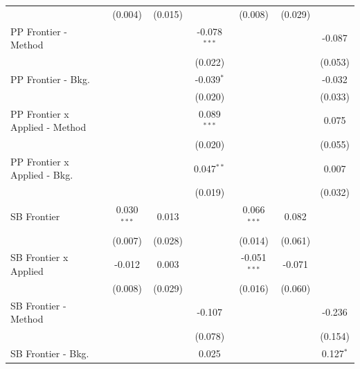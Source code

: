 \begin{tabular}{lcccccc}
                                  & (0.004)        & (0.015)        &                & (0.008)        & (0.029)        &   \\   
   PP Frontier - Method           &                &                & -0.078$^{***}$ &                &                & -0.087\\   
                                  &                &                & (0.022)        &                &                & (0.053)\\   
   PP Frontier - Bkg.             &                &                & -0.039$^{*}$   &                &                & -0.032\\   
                                  &                &                & (0.020)        &                &                & (0.033)\\   
   PP Frontier x Applied - Method &                &                & 0.089$^{***}$  &                &                & 0.075\\   
                                  &                &                & (0.020)        &                &                & (0.055)\\   
   PP Frontier x Applied - Bkg.   &                &                & 0.047$^{**}$   &                &                & 0.007\\   
                                  &                &                & (0.019)        &                &                & (0.032)\\   
   SB Frontier                    & 0.030$^{***}$  & 0.013          &                & 0.066$^{***}$  & 0.082          &   \\   
                                  & (0.007)        & (0.028)        &                & (0.014)        & (0.061)        &   \\   
   SB Frontier x Applied          & -0.012         & 0.003          &                & -0.051$^{***}$ & -0.071         &   \\   
                                  & (0.008)        & (0.029)        &                & (0.016)        & (0.060)        &   \\   
   SB Frontier - Method           &                &                & -0.107         &                &                & -0.236\\   
                                  &                &                & (0.078)        &                &                & (0.154)\\   
   SB Frontier - Bkg.             &                &                & 0.025          &                &                & 0.127$^{*}$\\   

\end{tabular}
